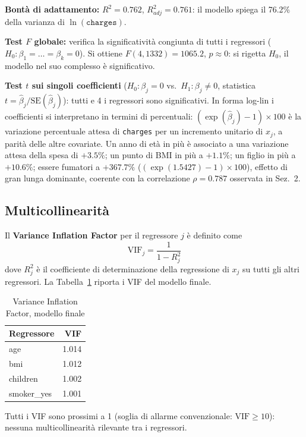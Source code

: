 \documentclass[11pt,a4paper]{article}
\begin{document}
\textbf{Bontà di adattamento:} $R^2=0.762$, $R^2_{adj}=0.761$: il modello
spiega il 76.2\% della varianza di $\ln(\texttt{charges})$.

\textbf{Test $F$ globale:} verifica la significatività congiunta di tutti
i regressori ($H_0:\beta_1=\dots=\beta_k=0$). Si ottiene
$F(4,1332)=1065.2$, $p\approx0$: si rigetta $H_0$, il modello nel
suo complesso è significativo.

\textbf{Test $t$ sui singoli coefficienti} ($H_0:\beta_j=0$ vs.\
$H_1:\beta_j\neq0$, statistica $t=\hat\beta_j/\mathrm{SE}(\hat\beta_j)$):
tutti e 4 i regressori sono significativi. In forma log-lin i coefficienti
si interpretano in termini di percentuali: $(\exp(\hat\beta_j)-1)\times100$
è la variazione percentuale attesa di \texttt{charges} per un incremento
unitario di $x_j$, a parità delle altre covariate. Un anno di età in più è
associato a una variazione attesa della spesa di $+3.5\%$; un punto di BMI
in più a $+1.1\%$; un figlio in più a $+10.6\%$; essere fumatori a
$+367.7\%$ ($(\exp(1.5427)-1)\times100$), effetto di gran lunga
dominante, coerente con la correlazione $\rho=0.787$ osservata in Sez.~2.

\subsection{Multicollinearità}
\label{sec:multicollinearita}
Il \textbf{Variance Inflation Factor} per il regressore $j$ è definito come
\begin{equation}
\mathrm{VIF}_j = \frac{1}{1-R_j^2}
\end{equation}
dove $R_j^2$ è il coefficiente di determinazione della regressione di
$x_j$ su tutti gli altri regressori. La Tabella~\ref{tab:vif} riporta i VIF
del modello finale.

\begin{table}[H]
\centering
\caption{Variance Inflation Factor, modello finale}
\label{tab:vif}
\begin{tabular}{lr}
\toprule
Regressore & VIF \\
\midrule
age        & 1.014 \\
bmi        & 1.012 \\
children   & 1.002 \\
smoker\_yes & 1.001 \\
\bottomrule
\end{tabular}
\end{table}

Tutti i VIF sono prossimi a 1 (soglia di allarme convenzionale:
$\mathrm{VIF}\geq10$): nessuna
multicollinearità rilevante tra i regressori.
\end{document}
